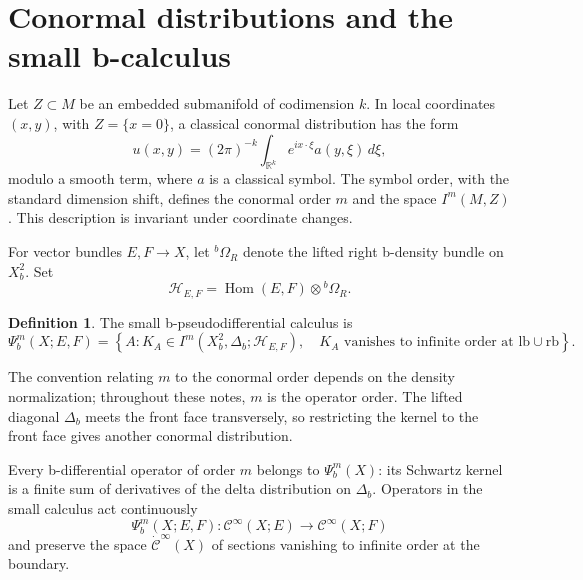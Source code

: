 \documentclass[12pt,oneside,reqno]{article}
\theoremstyle{plain}
\theoremstyle{definition}
\newtheorem{definition}[theorem]{Definition}
\theoremstyle{remark}
\begin{document}
\section{Conormal distributions and the small b-calculus}
\label{sec:small-calculus}

Let \(Z\subset M\) be an embedded submanifold of codimension \(k\). In local
coordinates \((x,y)\), with \(Z=\{x=0\}\), a classical conormal distribution
has the form
\[
 u(x,y)
 =
 (2\pi)^{-k}\int_{\mathbb R^k}e^{ix\cdot\xi}a(y,\xi)\,d\xi,
\]
modulo a smooth term, where \(a\) is a classical symbol. The symbol order,
with the standard dimension shift, defines the conormal order \(m\) and the
space \(I^m(M,Z)\). This description is invariant under coordinate changes.

For vector bundles \(E,F\to X\), let
\({}^b\Omega_R\) denote the lifted right b-density bundle on \(X_b^2\).
Set
\[
 \mathcal H_{E,F}
 =
 \operatorname{Hom}(E,F)\otimes{}^b\Omega_R.
\]

\begin{definition}
The small b-pseudodifferential calculus is
\[
 \Psi_b^m(X;E,F)
 =
 \left\{
 A:
 K_A\in
 I^m\!\left(
 X_b^2,\Delta_b;
 \mathcal H_{E,F}
 \right),
 \quad
 K_A\text{ vanishes to infinite order at }\mathrm{lb}\cup\mathrm{rb}
 \right\}.
\]
\end{definition}

The convention relating \(m\) to the conormal order depends on the density
normalization; throughout these notes, \(m\) is the operator order. The
lifted diagonal \(\Delta_b\) meets the front face transversely, so restricting
the kernel to the front face gives another conormal distribution.

Every b-differential operator of order \(m\) belongs to
\(\Psi_b^m(X)\): its Schwartz kernel is a finite sum of derivatives of the
delta distribution on \(\Delta_b\). Operators in the small calculus act
continuously
\[
 \Psi_b^m(X;E,F):
 \mathcal C^\infty(X;E)\longrightarrow\mathcal C^\infty(X;F)
\]
and preserve the space \(\dot{\mathcal C}^\infty(X)\) of sections vanishing
to infinite order at the boundary.
\end{document}

